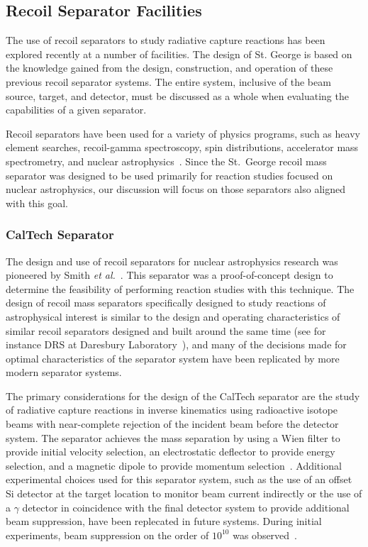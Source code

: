 \subsection{Recoil Separator Facilities}

The use of recoil separators to study radiative capture reactions has been
explored recently at a number of facilities. The design of St. George is based
on the knowledge gained from the design, construction, and operation of these
previous recoil separator systems. The entire system, inclusive of the beam
source, target, and detector, must be discussed as a whole when evaluating the
capabilities of a given separator.

Recoil separators have been used for a variety of physics programs, such as
heavy element searches, recoil-gamma spectroscopy, spin distributions,
accelerator mass spectrometry, and nuclear astrophysics~\cite{Davids2003}.
Since the St.\ George recoil mass separator was designed to be used primarily
for reaction studies focused on nuclear astrophysics, our discussion will
focus on those separators also aligned with this goal.

\subsubsection{CalTech Separator}
The design and use of recoil separators for nuclear astrophysics research was
pioneered by Smith \textit{et al.}~\cite{Smith1991}. This separator was a
proof-of-concept design to determine the feasibility of performing reaction
studies with this technique. The design of recoil mass separators specifically
designed to study reactions of astrophysical interest is similar to the design
and operating characteristics of similar recoil separators designed and built
around the same time (see for instance DRS at Daresbury
Laboratory~\cite{James1988}), and many of the decisions made for optimal
characteristics of the separator system have been replicated by more modern
separator systems.

The primary considerations for the design of the CalTech separator are the
study of radiative capture reactions in inverse kinematics using radioactive
isotope beams with near-complete rejection of the incident beam before the
detector system. The separator achieves the mass separation by using a Wien
filter to provide initial velocity selection, an electrostatic deflector to
provide energy selection, and a magnetic dipole to provide momentum
selection~\cite{Smith1991}. Additional experimental choices used for this
separator system, such as the use of an offset Si detector at the target
location to monitor beam current indirectly or the use of a $\gamma$ detector
in coincidence with the final detector system to provide additional beam
suppression, have been replecated in future systems. During initial
experiments, beam suppression on the order of $10^{10}$ was
observed~\cite{Smith1991}.

